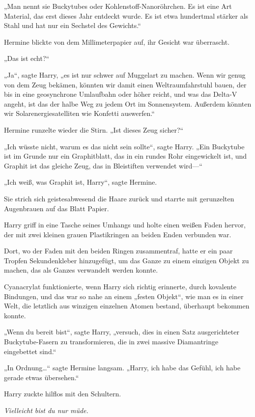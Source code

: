{„Man nennt sie Buckytubes oder Kohlenstoff-Nanoröhrchen. Es ist eine Art Material, das erst dieses Jahr entdeckt wurde. Es ist etwa hundertmal stärker als Stahl und hat nur ein Sechstel des Gewichts.“

Hermine blickte von dem Millimeterpapier auf, ihr Gesicht war überrascht.

„Das ist echt?“

„Ja“, sagte Harry, „es ist nur schwer auf Muggelart zu machen. Wenn wir genug von dem Zeug bekämen, könnten wir damit einen Weltraumfahrstuhl bauen, der bis in eine geosynchrone Umlaufbahn oder höher reicht, und was das Delta-V angeht, ist das der halbe Weg zu jedem Ort im Sonnensystem. Außerdem könnten wir Solarenergiesatelliten wie Konfetti auswerfen.“

Hermine runzelte wieder die Stirn. „Ist dieses Zeug sicher?“

„Ich wüsste nicht, warum es das nicht sein sollte“, sagte Harry. „Ein Buckytube ist im Grunde nur ein Graphitblatt, das in ein rundes Rohr eingewickelt ist, und Graphit ist das gleiche Zeug, das in Bleistiften verwendet wird—“

„Ich weiß, was Graphit ist, Harry“, sagte Hermine.

Sie strich sich geistesabwesend die Haare zurück und starrte mit gerunzelten Augenbrauen auf das Blatt Papier.

Harry griff in eine Tasche seines Umhangs und holte einen weißen Faden hervor, der mit zwei kleinen grauen Plastikringen an beiden Enden verbunden war.

Dort, wo der Faden mit den beiden Ringen zusammentraf, hatte er ein paar Tropfen Sekundenkleber hinzugefügt, um das Ganze zu einem einzigen Objekt zu machen, das als Ganzes verwandelt werden konnte.

Cyanacrylat funktionierte, wenn Harry sich richtig erinnerte, durch kovalente Bindungen, und das war so nahe an einem „festen Objekt“, wie man es in einer Welt, die letztlich aus winzigen einzelnen Atomen bestand, überhaupt bekommen konnte.

„Wenn du bereit bist“, sagte Harry, „versuch, dies in einen Satz ausgerichteter Buckytube-Fasern zu transformieren, die in zwei massive Diamantringe eingebettet sind.“

„In Ordnung…“ sagte Hermine langsam. „Harry, ich habe das Gefühl, ich habe gerade etwas übersehen.“

Harry zuckte hilflos mit den Schultern.

\emph{Vielleicht bist du nur müde.}

}
